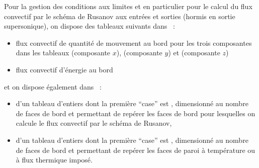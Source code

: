 \bigskip
Pour la gestion des conditions aux limites et en particulier pour le calcul du
flux convectif par le schéma de Rusanov
aux entrées et sorties (hormis en sortie supersonique), on
dispose des tableaux suivants dans  ~:
\begin{itemize}
\item flux convectif de quantité de mouvement au bord pour les trois
composantes dans les tableaux
 (composante $x$),
 (composante $y$) et
 (composante $z$)
\item flux convectif d'énergie au bord
\end{itemize}
et on dispose également dans ~:
\begin{itemize}
\item d'un tableau d'entiers dont la première ``case'' est , dimensionné au nombre de faces de bord
et permettant de repérer les faces de bord pour lesquelles on calcule
le flux convectif par le schéma de Rusanov,
\item d'un tableau  d'entiers dont la première ``case'' est , dimensionné au nombre de faces de bord
et permettant de repérer les faces de paroi à température ou à flux
thermique imposé.
\end{itemize}



\newpage

